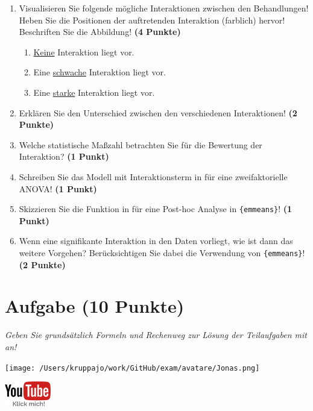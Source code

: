 \documentclass[a4paper, 9pt]{scrartcl}\usepackage[]{graphicx}\usepackage[]{xcolor}
\begin{document}
\begin{enumerate}
\item Visualisieren Sie folgende mögliche Interaktionen zwischen den Behandlungen! Heben Sie die Positionen der auftretenden Interaktion (farblich) hervor! Beschriften Sie die Abbildung! \textbf{(4 Punkte)}
\begin{enumerate}
\item \underline{Keine} Interaktion liegt vor.
\item Eine \underline{schwache} Interaktion liegt vor. 
\item Eine \underline{starke} Interaktion liegt vor. 
\end{enumerate}
\item Erklären Sie den Unterschied zwischen den verschiedenen Interaktionen! \textbf{(2 Punkte)}
\item Welche statistische Maßzahl betrachten Sie für die Bewertung der Interaktion? \textbf{(1 Punkt)}
\item Schreiben Sie das Modell mit Interaktionsterm in \Rlogo für eine zweifaktorielle ANOVA! \textbf{(1 Punkt)} 
\item Skizzieren Sie die Funktion in \Rlogo für eine Post-hoc Analyse in \texttt{\{emmeans\}}! \textbf{(1 Punkt)} 
\item Wenn eine signifikante Interaktion in den Daten vorliegt, wie ist dann das weitere Vorgehen? Berücksichtigen Sie dabei die Verwendung von \texttt{\{emmeans\}}! \textbf{(2 Punkte)}
\end{enumerate}

 
\clearpage

\section{Aufgabe \hfill (10 Punkte)}

\textit{Geben Sie grundsätzlich Formeln und Rechenweg zur Lösung der Teilaufgaben mit an!} \\[1Ex]
 

 
\ifcollection
\begin{flushright}
\tiny\vspace{-3Ex}
\textbf{\examinhaltstart}
\exammodulebiostat
\vspace{-4Ex}
\end{flushright}
\begin{minipage}[t]{0.5\textwidth}
\texttt{[image: /Users/kruppajo/work/GitHub/exam/avatare/Jonas.png]}
\end{minipage}
\begin{minipage}[t]{0.5\textwidth}
\hfill
\href{https://youtu.be/X0-2he7ByMA}{\includegraphics[width = 2cm]{img/youtube}}
\end{minipage}
\vspace{-3Ex}
\fi
\end{document}
